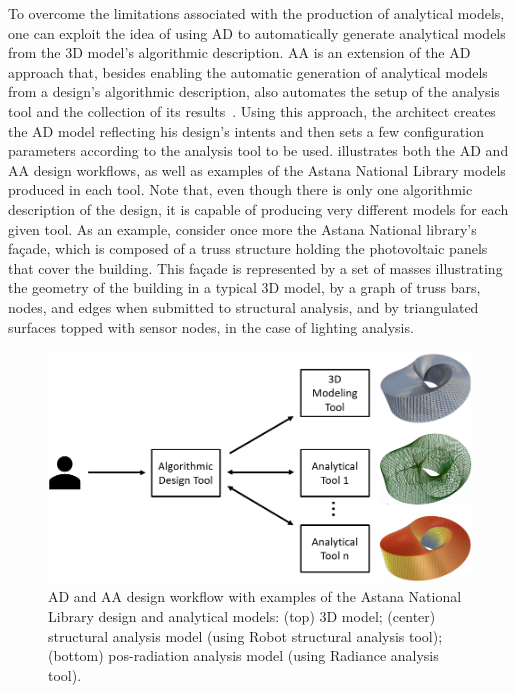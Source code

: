 To overcome the limitations associated with the production of analytical models, one can exploit the idea of using \ac{AD} to automatically generate analytical models from the 3D model's algorithmic description. \ac{AA} is an extension of the \ac{AD} approach that, besides enabling the automatic generation of analytical models from a design's algorithmic description, also automates the setup of the analysis tool and the collection of its results~\cite{Aguiar2017}. Using this approach, the architect creates the \ac{AD} model reflecting his design's intents and then sets a few configuration parameters according to the analysis tool to be used.  illustrates both the \ac{AD} and \ac{AA} design workflows, as well as examples of the Astana National Library models produced in each tool. Note that, even though there is only one algorithmic description of the design, it is capable of producing very different models for each given tool. As an example, consider once more the Astana National library's façade, which is composed of a truss structure holding the photovoltaic panels that cover the building. This façade is represented by a set of masses illustrating the geometry of the building in a typical 3D model, by a graph of truss bars, nodes, and edges when submitted to structural analysis, and by triangulated surfaces topped with sensor nodes, in the case of lighting analysis.


\begin{figure}[htbp]
\centering
\includegraphics[width=1\textwidth]{./Images/Introduction/AlgorithmicDesignAndAnalysis_w_models2.png}
\caption[General view of the Algorithmic Design and Analysis approach]{\ac{AD} and \ac{AA} design workflow with examples of the Astana National Library design and analytical models: (top) 3D model; (center) structural analysis model (using Robot structural analysis tool); (bottom) pos-radiation analysis model (using Radiance analysis tool).}
\label{fig:algorithmicanalysis}
\end{figure}		
	

